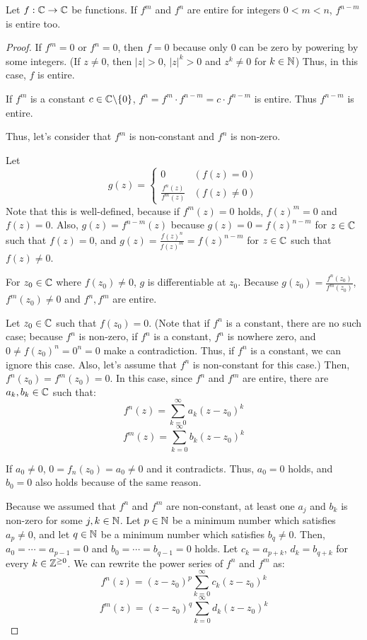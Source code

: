 \begin{lemma}\label{lem-7-n-m}
  Let \(f: \mathbb{C} \to \mathbb{C}\) be functions.
  If \(f^m\) and \(f^n\) are entire for integers \(0 < m < n\),
  \(f^{n - m}\) is entire too.
\end{lemma}
\begin{proof}
  If \(f^m = 0\) or \(f^n = 0\), then \(f = 0\) because only \(0\) can be zero by powering by some integers. (If \(z \neq 0\), then \(|z| > 0\), \(|z|^k > 0\) and \(z^k \neq 0\) for \(k \in \mathbb{N}\))
  Thus, in this case, \(f\) is entire.

  If \(f^m\) is a constant \(c \in \bbC \bs \{0\}\),
  \(f^n = f^m \cdot f^{n - m} = c \cdot f^{n - m}\) is entire. Thus \(f^{n - m}\) is entire.

  Thus, let's consider that \(f^m\) is non-constant and \(f^n\) is non-zero.

  Let
  \[g(z) = \left\{
    \begin{array}{cl}
      0 & (f(z) = 0) \\
      \frac{f^n(z)}{f^m(z)} & (f(z) \neq 0)
    \end{array}
    \right.\]
  Note that this is well-defined, because if \(f^m(z) = 0\) holds, \(f(z)^m = 0\) and \(f(z) = 0\).
  Also, \(g(z) = f^{n - m}(z)\)
  because \(g(z) = 0 = f(z)^{n - m}\) for \(z \in \mathbb{C}\) such that \(f(z) = 0\),
  and \(g(z) = \frac{f(z)^n}{f(z)^m} = f(z)^{n - m}\) for \(z \in \mathbb{C}\) such that \(f(z) \neq 0\).

  For \(z_0 \in \mathbb{C}\) where \(f(z_0) \neq 0\), \(g\) is differentiable at \(z_0\).
  Because \(g(z_0) = \frac{f^n(z_0)}{f^m(z_0)}\),
  \(f^m(z_0) \neq 0\) and \(f^n, f^m\) are entire.

  Let \(z_0 \in \mathbb{C}\) such that \(f(z_0) = 0\).
  (Note that if \(f^n\) is a constant, there are no such case; because \(f^n\) is non-zero, if \(f^n\) is a constant, \(f^n\) is nowhere zero, and \(0 \neq f(z_0)^n = 0^n = 0\) make a contradiction.
  Thus, if \(f^n\) is a constant, we can ignore this case.
  Also, let's assume that \(f^n\) is non-constant for this case.)
  Then, \(f^n(z_0) = f^m(z_0) = 0\).
  In this case, since \(f^n\) and \(f^m\) are entire, there are \(a_k, b_k \in \mathbb{C}\) such that:
  \[f^n(z) = \sum_{k=0}^{\infty} a_k (z - z_0)^k\]
  \[f^m(z) = \sum_{k=0}^{\infty} b_k (z - z_0)^k\]

  If \(a_0 \neq 0\), \(0 = f_n(z_0) = a_0 \neq 0\) and it contradicts.
  Thus, \(a_0 = 0\) holds, and \(b_0 = 0\) also holds because of the same reason.

  Because we assumed that \(f^n\) and \(f^m\) are non-constant, at least one \(a_j\) and \(b_k\) is non-zero for some \(j, k \in \mathbb{N}\).
  Let \(p \in \mathbb{N}\) be a minimum number which satisfies \(a_p \neq 0\),
  and let \(q \in \mathbb{N}\) be a minimum number which satisfies \(b_q \neq 0\).
  Then, \(a_0 = \cdots = a_{p - 1} = 0\) and \(b_0 = \cdots = b_{q - 1} = 0\) holds.
  Let \(c_k = a_{p + k}\), \(d_k = b_{q + k}\) for every \(k \in \mathbb{Z}^{\ge 0}\).
  We can rewrite the power series of \(f^n\) and \(f^m\) as:
  \[f^n(z) = (z - z_0)^p \sum_{k=0}^{\infty} c_k (z - z_0)^k\]
  \[f^m(z) = (z - z_0)^q \sum_{k=0}^{\infty} d_k (z - z_0)^k\]


\end{proof}
